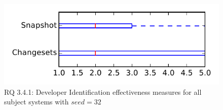
\begin{figure}
\centering
\includegraphics[height=0.4\textheight]{figures/dit_seed/rq1_tiny_32}
\caption{RQ 3.4.1: Developer Identification effectiveness measures for all subject systems with $seed=32$}
\label{fig:dit_seed:rq1:tiny}
\end{figure}

